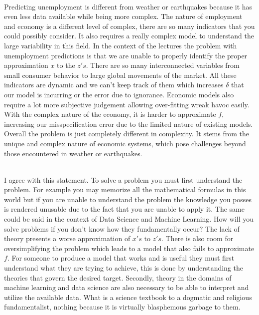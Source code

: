 \documentclass[12pt]{article}
\begin{document}
\begin{enumerate}
 \\ 

Predicting unemployment is different from weather or earthquakes because it has even less data available while being more complex. The nature of employment and economy is a different level of complex, there are so many indicators that you could possibly consider. It also requires a really complex model to understand the large variability in this field. In the context of the lectures the problem with unemployment predictions is that we are unable to properly identify the proper approximation \(x\) to the \(z's\). There are so many interconnected variables from small consumer behavior to large global movements of the market.  All these indicators are dynamic and we can't keep track of them which increases \( \delta \) that our model is incurring or the error due to ignorance. Economic models also require a lot more subjective judgement allowing over-fitting wreak havoc easily. With the complex nature of the economy, it is harder to approximate \(f\), increasing our misspecification error due to the limited nature of existing models. Overall the problem is just completely different in complexity. It stems from the unique and complex nature of economic systems, which pose challenges beyond those encountered in weather or earthquakes.
 

 \\ 
I agree with this statement. To solve a problem you must first understand the problem. For example you may memorize all the mathematical formulas in this world but if you are unable to understand the problem the knowledge you posses is rendered unusable due to the fact that you are unable to apply it. The same could be said in the context of Data Science and Machine Learning. How will you solve problems if you don't know how they fundamentally occur? The lack of theory presents a worse approximation of \(x's\) to \(z's\). There is also room for oversimplifying the problem which leads to a model that also fails to approximate \(f\). For someone to produce a model that works and is useful they must first understand what they are trying to achieve, this is done by understanding the theories that govern the desired target. Secondly, theory in the domains of machine learning and data science are also necessary to be able to interpret and utilize the available data. What is a science textbook to a dogmatic and religious fundamentalist, nothing because it is virtually blasphemous garbage to them.


\end{enumerate}
\newpage
\end{document}
